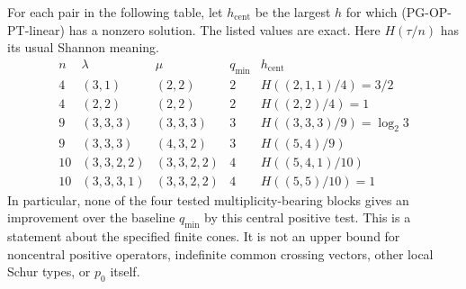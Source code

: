 \begin{proposition}
\label{pg:op-pt-finite}
For each pair in the following table, let $h_{\mathrm{cent}}$ be the
largest $h$ for which (PG-OP-PT-linear) has a nonzero solution. The listed
values are exact. Here $H(\tau/n)$ has its usual Shannon meaning.
\[
\begin{array}{c|c|c|c|c}
 n&\lambda&\mu&q_{\min}&h_{\mathrm{cent}}\\ \hline
 4&(3,1)&(2,2)&2&H((2,1,1)/4)=3/2\\
 4&(2,2)&(2,2)&2&H((2,2)/4)=1\\
 9&(3,3,3)&(3,3,3)&3&H((3,3,3)/9)=\log_2 3\\
 9&(3,3,3)&(4,3,2)&3&H((5,4)/9)\\
 10&(3,3,2,2)&(3,3,2,2)&4&H((5,4,1)/10)\\
 10&(3,3,3,1)&(3,3,2,2)&4&H((5,5)/10)=1
\end{array}
\]
In particular, none of the four tested multiplicity-bearing blocks gives
an improvement over the baseline $q_{\min}$ by this central positive
test. This is a statement about the specified finite cones. It is not an
upper bound for noncentral positive operators, indefinite common
crossing vectors, other local Schur types, or $p_0$ itself.
\end{proposition}
